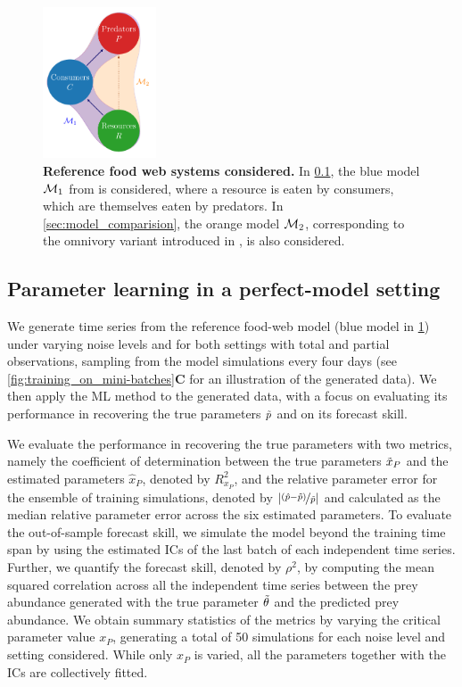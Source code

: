 \begin{figure}[h]
    \centering
    \includegraphics[width=0.3\textwidth]{figures/figure2.pdf}
    \caption{\textbf{Reference food web systems considered.} In \cref{sec:perfect-model}, the blue model $\mathcal{M}_1$ from \citep{Hastings1991} is considered, where a resource is eaten by consumers, which are themselves eaten by predators. In \cref{sec:model_comparision}, the orange model $\mathcal{M}_2$, corresponding to the omnivory variant introduced in \citep{McCann1997}, is also considered.}
    \label{fig:3species_foodchain_simple}
\end{figure}
\FloatBarrier

\subsection{Parameter learning in a perfect-model setting}\label{sec:perfect-model}

We generate time series from the reference food-web model (blue model in \cref{fig:3species_foodchain_simple}) under varying noise levels and for both settings with total and partial observations, sampling from the model simulations every four days (see \cref{fig:training_on_mini-batches}\textbf{C} for an illustration of the generated data).
%
We then apply the ML method to the generated data, with a focus on evaluating its performance in recovering the true parameters $\Tilde{p}$ and on its forecast skill.

We evaluate the performance in recovering the true parameters with two metrics, namely the coefficient of determination between the true parameters $\Tilde x_P$ and the estimated parameters $\hat x_P$, denoted by $R^2_{x_P}$, and the relative parameter error for the ensemble of training simulations, denoted by $|\nicefrac{(\hat p -\Tilde{p})}{\Tilde{p}}|$ and calculated as the median relative parameter error across the six estimated parameters.
%
To evaluate the out-of-sample forecast skill, we simulate the model beyond the training time span by using the estimated ICs of the last batch of each independent time series. Further, we quantify the forecast skill, denoted by $\rho^2$, by computing the mean squared correlation across all the independent time series between the prey abundance generated with the true parameter $\Tilde{\theta}$ and the predicted prey abundance.
% 
We obtain summary statistics of the metrics by varying the critical parameter value $x_P$, generating a total of 50 simulations for each noise level and setting considered.  While only $x_P$ is varied, all the parameters together with the ICs are collectively fitted. 

